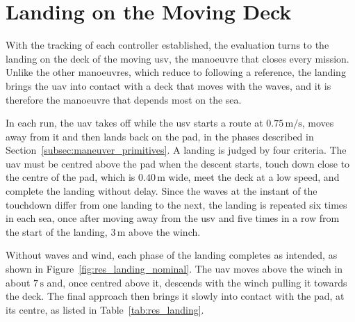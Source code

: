
\section{Landing on the Moving Deck}
\label{sec:res_disturbances}

With the tracking of each controller established, the evaluation turns to the landing on the deck of the moving \gls{usv}, the manoeuvre that closes every mission. Unlike the other manoeuvres, which reduce to following a reference, the landing brings the \gls{uav} into contact with a deck that moves with the waves, and it is therefore the manoeuvre that depends most on the sea.

In each run, the \gls{uav} takes off while the \gls{usv} starts a route at $0.75\,\text{m/s}$, moves away from it and then lands back on the pad, in the phases described in Section~\ref{subsec:maneuver_primitives}. A landing is judged by four criteria. The \gls{uav} must be centred above the pad when the descent starts, touch down close to the centre of the pad, which is $0.40\,\text{m}$ wide, meet the deck at a low speed, and complete the landing without delay. Since the waves at the instant of the touchdown differ from one landing to the next, the landing is repeated six times in each sea, once after moving away from the \gls{usv} and five times in a row from the start of the landing, $3\,\text{m}$ above the winch.

Without waves and wind, each phase of the landing completes as intended, as shown in Figure~\ref{fig:res_landing_nominal}. The \gls{uav} moves above the winch in about $7\,\text{s}$ and, once centred above it, descends with the winch pulling it towards the deck. The final approach then brings it slowly into contact with the pad, at its centre, as listed in Table~\ref{tab:res_landing}.

